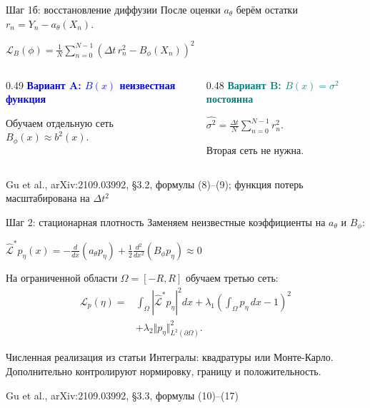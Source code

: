 \documentclass[10pt,aspectratio=169]{beamer}
\newcommand{\src}[1]{\vfill{\tiny\color{graytext}Gu et al., arXiv:2109.03992, #1}}
\begin{document}
\begin{frame}{Шаг 1б: восстановление диффузии}
\vspace{0.12cm}
После оценки $a_\theta$ берём остатки $r_n=Y_n-a_\theta(X_n)$.
\begin{center}
\large $\displaystyle\boxed{\mathcal L_B(\phi)=\frac1N\sum_{n=0}^{N-1}\left(\Delta t\,r_n^2-B_\phi(X_n)\right)^2}$
\end{center}
\vspace{0.2cm}
\begin{columns}[T,onlytextwidth]
\begin{column}{0.49\textwidth}
\textcolor{blue}{\bfseries Вариант A: $B(x)$ неизвестная функция}\par\vspace{0.16cm}
Обучаем отдельную сеть $B_\phi(x)\approx b^2(x)$.
\end{column}
\begin{column}{0.48\textwidth}
\textcolor{teal}{\bfseries Вариант B: $B(x)=\sigma^2$ постоянна}\par\vspace{0.16cm}
$\displaystyle\widehat{\sigma^2}=\frac{\Delta t}{N}\sum_{n=0}^{N-1}r_n^2$.\par\vspace{0.1cm}
Вторая сеть не нужна.
\end{column}
\end{columns}
\src{\S 3.2, формулы (8)--(9); функция потерь масштабирована на $\Delta t^2$}
\end{frame}

\begin{frame}[shrink=4]{Шаг 2: стационарная плотность}
\vspace{0.06cm}
Заменяем неизвестные коэффициенты на $a_\theta$ и $B_\phi$:
\begin{center}
$\displaystyle \boxed{\widehat{\mathcal L}^{\!*}p_\eta(x)=-\frac{d}{dx}(a_\theta p_\eta)+\frac12\frac{d^2}{dx^2}(B_\phi p_\eta)\approx0}$
\end{center}
\vspace{0.1cm}
На ограниченной области $\Omega=[-R,R]$ обучаем третью сеть:
\vspace{-0.1cm}
\begin{align*}
\mathcal L_p(\eta)={}&\int_\Omega |\widehat{\mathcal L}^{\!*}p_\eta|^2dx
+\lambda_1\left(\int_\Omega p_\eta\,dx-1\right)^2\\
&+\lambda_2\Vert p_\eta\Vert_{L^2(\partial\Omega)}^2.
\end{align*}
\vspace{-0.10cm}
\begin{block}{Численная реализация из статьи}
Интегралы: квадратуры или Монте-Карло. Дополнительно контролируют нормировку, границу и положительность.
\end{block}
\src{\S 3.3, формулы (10)--(17)}
\end{frame}
\end{document}
